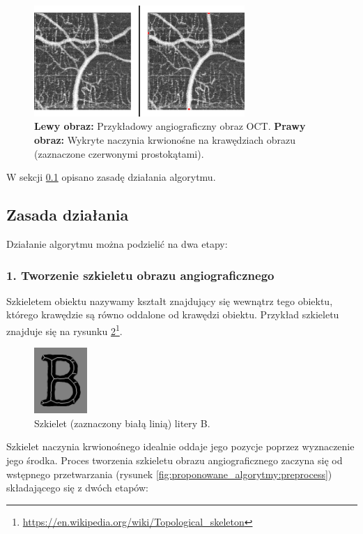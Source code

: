 \begin{figure}[H]
  \centering
  \includegraphics[width=8cm]{gfx/paths_detected}
  \caption{\textbf{Lewy obraz:} Przykładowy angiograficzny obraz OCT. \textbf{Prawy obraz:} Wykryte naczynia krwionośne na krawędziach obrazu (zaznaczone czerwonymi prostokątami).}
  \label{fig:proponowane_algorytmy:paths_detected}
\end{figure}

W sekcji \ref{sec:proponowane_algorytmy:zasada_dzialania} opisano zasadę działania algorytmu.

\subsection{Zasada działania}
\label{sec:proponowane_algorytmy:zasada_dzialania}

Działanie algorytmu można podzielić na dwa etapy:

\subsubsection{1. Tworzenie szkieletu obrazu angiograficznego}

Szkieletem obiektu nazywamy kształt znajdujący się wewnątrz tego obiektu, którego krawędzie są równo oddalone od krawędzi obiektu. Przykład szkieletu znajduje się na rysunku \ref{fig:proponowane_algorytmy:skel}\footnote{\url{https://en.wikipedia.org/wiki/Topological_skeleton}}.

\begin{figure}[H]
  \centering
  \includegraphics[width=2cm]{gfx/skel}
  \caption{Szkielet (zaznaczony białą linią) litery B.}
  \label{fig:proponowane_algorytmy:skel}
\end{figure}

Szkielet naczynia krwionośnego idealnie oddaje jego pozycje poprzez wyznaczenie jego środka. Proces tworzenia szkieletu obrazu angiograficznego zaczyna się od wstępnego przetwarzania (rysunek \ref{fig:proponowane_algorytmy:preprocess}) składającego się z dwóch etapów:

